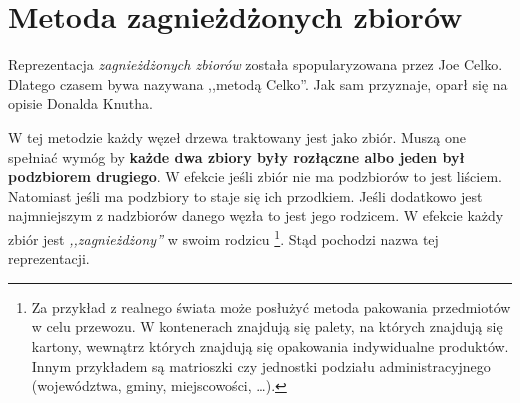 \section{Metoda zagnieżdżonych zbiorów}

Reprezentacja \emph{zagnieżdżonych zbiorów}  została spopularyzowana przez Joe Celko\cite{celko-sql}.
Dlatego czasem bywa nazywana ,,metodą Celko''.
Jak sam przyznaje, oparł się na opisie Donalda Knutha\cite{knuth}.





%


W tej metodzie każdy węzeł drzewa traktowany jest jako zbiór.
Muszą one spełniać wymóg by \textbf{każde dwa zbiory były rozłączne albo jeden był podzbiorem drugiego}.
W efekcie jeśli zbiór nie ma podzbiorów to jest liściem.
Natomiast jeśli ma podzbiory to staje się ich przodkiem.
Jeśli dodatkowo jest najmniejszym z nadzbiorów danego węzła to jest jego rodzicem.
W efekcie każdy zbiór jest \emph{,,zagnieżdżony''} w swoim rodzicu%
\footnote{
    Za przykład z realnego świata może posłużyć metoda pakowania przedmiotów w celu przewozu.
    W kontenerach znajdują się palety, na których znajdują się kartony, wewnątrz których znajdują się opakowania indywidualne produktów.
    Innym przykładem są matrioszki czy jednostki podziału administracyjnego (województwa, gminy, miejscowości, \ldots).
}.
Stąd pochodzi nazwa tej reprezentacji.

